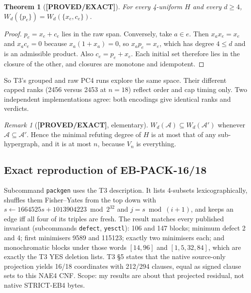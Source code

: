 \documentclass[11pt]{article}
\newtheorem{theorem}{Theorem}
\theoremstyle{remark}
\newtheorem{remark}{Remark}
\newcommand{\lab}[1]{\textbf{[#1]}}
\begin{document}
\begin{theorem}[\lab{PROVED/EXACT}]\label{thm:enc}
For every 4-uniform $H$ and every $d\ge4$,
$W_d(\{p_e\})=W_d(\{x_e,c_e\})$.
\end{theorem}
\begin{proof}
$p_e=x_e+c_e$ lies in the raw span. Conversely, take $a\in e$. Then $x_ax_e=x_e$ and
$x_ac_e=0$ because $x_a(1+x_a)=0$, so $x_ap_e=x_e$, which has degree $4\le d$ and is an
admissible product. Also $c_e=p_e+x_e$. Each initial set therefore lies in the closure of the
other, and closures are monotone and idempotent.
\end{proof}
\noindent So T3's grouped and raw PC4 runs explore the same space. Their different capped
ranks (2456 versus 2453 at $n=18$) reflect order and cap timing only. Two independent
implementations agree: both encodings give identical ranks and verdicts.

\begin{remark}[\lab{PROVED/EXACT}, elementary]
$W_d(\mathcal A)\subseteq W_d(\mathcal A')$ whenever $\mathcal A\subseteq\mathcal A'$. Hence
the minimal refuting degree of $H$ is at most that of any sub-hypergraph, and it is at most
$n$, because $V_n$ is everything.
\end{remark}

\subsection{Exact reproduction of EB-PACK-16/18}
Subcommand \texttt{packgen} uses the T3 description. It lists 4-subsets lexicographically,
shuffles them Fisher--Yates from the top down with $s\leftarrow 1664525s+1013904223 \bmod
2^{32}$ and $j=s\bmod(i+1)$, and keeps an edge iff all four of its triples are fresh. The
result matches every published invariant (subcommands \texttt{defect}, \texttt{yesctl}):
106 and 147 blocks; minimum defect 2 and 4; first minimisers 9589 and 115123; exactly two
minimisers each; and monochromatic blocks under those words $[14,96]$ and $[1,5,32,84]$, which
are exactly the T3 YES deletion lists. T3 \S5 states that the native source-only projection
yields 16/18 coordinates with 212/294 clauses, equal as signed clause sets to this NAE4 CNF.
Scope: my results are about that projected residual, not native STRICT-EB4 bytes.
\end{document}

